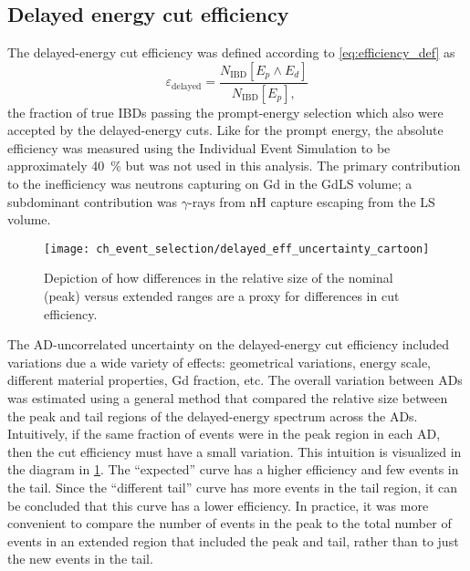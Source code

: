 \subsection{Delayed energy cut efficiency}
\label{subsec:eff_delayed}

The delayed-energy cut efficiency was defined according to \cref{eq:efficiency_def} as
\begin{equation}\label{eq:delayed_eff}
    \varepsilon_\text{delayed} = \frac{N_\text{IBD}[E_p \wedge E_d]}{
        N_\text{IBD}[E_p],
    }
\end{equation}
the fraction of true IBDs passing the prompt-energy selection
which also were accepted by the delayed-energy cuts.
Like for the prompt energy, the absolute efficiency
was measured using the Individual Event Simulation to be approximately \SI{40}{\percent}
but was not used in this analysis.
The primary contribution to the inefficiency
was neutrons capturing on Gd in the GdLS volume;
a subdominant contribution was $\gamma$-rays from nH capture escaping from the LS volume.

\begin{figure}
    \centering
    \texttt{[image: ch\_event\_selection/delayed\_eff\_uncertainty\_cartoon]}
    \caption[Delayed energy efficiency diagram]{
        Depiction of how differences in the relative size
        of the nominal (peak) versus extended ranges
        are a proxy for differences in cut efficiency.
    }
    \label{fig:delayed_eff_unc_cartoon}
\end{figure}

The AD-uncorrelated uncertainty on the delayed-energy cut efficiency
included variations due a wide variety of effects:
geometrical variations, energy scale, different material properties,
Gd fraction, etc.
The overall variation between ADs was estimated using a general method
that compared the relative size between the peak and tail regions
of the delayed-energy spectrum across the ADs.
Intuitively, if the same fraction of events were in the peak region in each AD,
then the cut efficiency must have a small variation.
This intuition is visualized in the diagram in \cref{fig:delayed_eff_unc_cartoon}.
The ``expected'' curve has a higher efficiency
and few events in the tail.
Since the ``different tail'' curve has more events in the tail region,
it can be concluded that this curve has a lower efficiency.
In practice, it was more convenient to compare the number of events in the peak
to the total number of events in an extended region that included the peak and tail,
rather than to just the new events in the tail.


